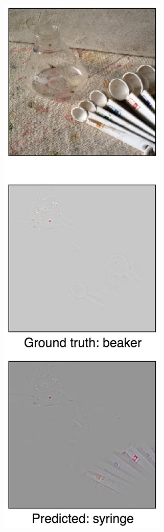 \begin{figure}[ht!]
\begin{center}
\begin{subfigure}[b]{0.23\linewidth}
        \caption{}
        \label{fig:failure_mirror}
    \end{subfigure}
    \begin{subfigure}[b]{0.23\linewidth}
        \centering
        \includegraphics[width=1\linewidth]{figures/failure_60.jpg}

\end{subfigure}
\end{center}
\end{figure}
